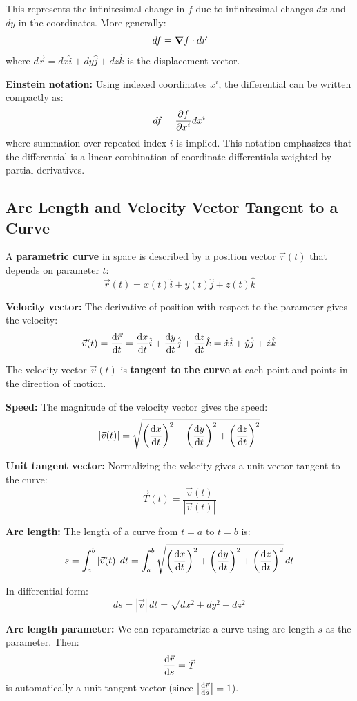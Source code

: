 This represents the infinitesimal change in $f$ due to infinitesimal changes $dx$ and $dy$ in the coordinates. More generally:
\[
df = \grad f \cdot d\vec{r}
\]
where $d\vec{r} = dx\hat{i} + dy\hat{j} + dz\hat{k}$ is the displacement vector.

\textbf{Einstein notation:} Using indexed coordinates $x^i$, the differential can be written compactly as:
\[
df = \pdv{f}{x^i}dx^i
\]
where summation over repeated index $i$ is implied. This notation emphasizes that the differential is a linear combination of coordinate differentials weighted by partial derivatives.

\subsection{Arc Length and Velocity Vector Tangent to a Curve}

A \textbf{parametric curve} in space is described by a position vector $\vec{r}(t)$ that depends on parameter $t$:
\[
\vec{r}(t) = x(t)\hat{i} + y(t)\hat{j} + z(t)\hat{k}
\]

\textbf{Velocity vector:} The derivative of position with respect to the parameter gives the velocity:
\[
\vec{v}(t) = \dv{\vec{r}}{t} = \dv{x}{t}\hat{i} + \dv{y}{t}\hat{j} + \dv{z}{t}\hat{k} = \dot{x}\hat{i} + \dot{y}\hat{j} + \dot{z}\hat{k}
\]

The velocity vector $\vec{v}(t)$ is \textbf{tangent to the curve} at each point and points in the direction of motion.

\textbf{Speed:} The magnitude of the velocity vector gives the speed:
\[
|\vec{v}(t)| = \sqrt{\left(\dv{x}{t}\right)^2 + \left(\dv{y}{t}\right)^2 + \left(\dv{z}{t}\right)^2}
\]

\textbf{Unit tangent vector:} Normalizing the velocity gives a unit vector tangent to the curve:
\[
\vec{T}(t) = \frac{\vec{v}(t)}{|\vec{v}(t)|}
\]

\textbf{Arc length:} The length of a curve from $t = a$ to $t = b$ is:
\[
s = \int_a^b |\vec{v}(t)| \, dt = \int_a^b \sqrt{\left(\dv{x}{t}\right)^2 + \left(\dv{y}{t}\right)^2 + \left(\dv{z}{t}\right)^2} \, dt
\]

In differential form:
\[
ds = |\vec{v}| \, dt = \sqrt{dx^2 + dy^2 + dz^2}
\]

\textbf{Arc length parameter:} We can reparametrize a curve using arc length $s$ as the parameter. Then:
\[
\dv{\vec{r}}{s} = \vec{T}
\]
is automatically a unit tangent vector (since $\left|\dv{\vec{r}}{s}\right| = 1$).

